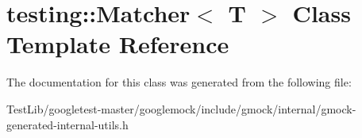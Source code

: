 \hypertarget{classtesting_1_1Matcher}{}\section{testing\+:\+:Matcher$<$ T $>$ Class Template Reference}
\label{classtesting_1_1Matcher}


The documentation for this class was generated from the following file\+:\begin{DoxyCompactItemize}
\item 
Test\+Lib/googletest-\/master/googlemock/include/gmock/internal/gmock-\/generated-\/internal-\/utils.\+h\end{DoxyCompactItemize}
